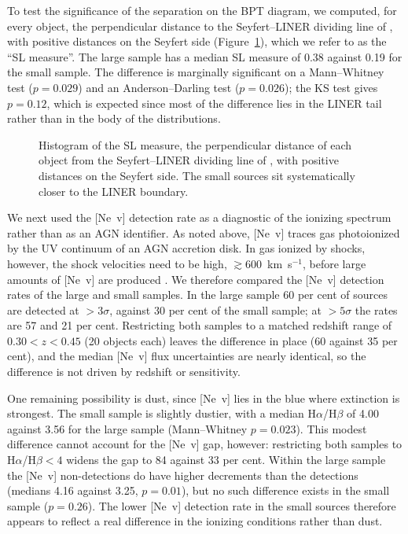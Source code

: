 \documentclass[linenumbers,trackchanges]{aastex701}
\begin{document}
To test the significance of the separation on the BPT diagram, we computed, for every object, the perpendicular distance to the Seyfert--LINER dividing line of \citet{kewley2006}, with positive distances on the Seyfert side (Figure~\ref{fig:bptdist}), which we refer to as the ``SL measure''. The large sample has a median SL measure of 0.38 against 0.19 for the small sample. The difference is marginally significant on a Mann--Whitney test ($p = 0.029$) and an Anderson--Darling test ($p = 0.026$); the KS test gives $p = 0.12$, which is expected since most of the difference lies in the LINER tail rather than in the body of the distributions. 

\begin{figure}
\caption{Histogram of the SL measure, the perpendicular distance of each object from the Seyfert--LINER dividing line of \citet{kewley2006}, with positive distances on the Seyfert side. The small sources sit systematically closer to the LINER boundary.}
\label{fig:bptdist}
\end{figure}

We next used the [Ne~{\sc v}] detection rate as a diagnostic of the ionizing spectrum rather than as an AGN identifier. As noted above, [Ne~{\sc v}] traces gas photoionized by the UV continuum of an AGN accretion disk. In gas ionized by shocks, however, the shock velocities need to be high, $\gtrsim 600$~km~s$^{-1}$, before large amounts of [Ne~{\sc v}] are produced \citep{Allen08}. We therefore compared the [Ne~{\sc v}] detection rates of the large and small samples. In the large sample 60 per cent of sources are detected at $>3\sigma$, against 30 per cent of the small sample; at $>5\sigma$ the rates are 57 and 21 per cent. Restricting both samples to a matched redshift range of $0.30 < z < 0.45$ (20 objects each) leaves the difference in place (60 against 35 per cent), and the median [Ne~{\sc v}] flux uncertainties are nearly identical, so the difference is not driven by redshift or sensitivity.

One remaining possibility is dust, since [Ne~{\sc v}] lies in the blue where extinction is strongest. The small sample is slightly dustier, with a median H$\alpha$/H$\beta$ of 4.00 against 3.56 for the large sample (Mann--Whitney $p = 0.023$). This modest difference cannot account for the [Ne~{\sc v}] gap, however: restricting both samples to H$\alpha$/H$\beta < 4$ widens the gap to 84 against 33 per cent. Within the large sample the [Ne~{\sc v}] non-detections do have higher decrements than the detections (medians 4.16 against 3.25, $p = 0.01$), but no such difference exists in the small sample ($p = 0.26$). The lower [Ne~{\sc v}] detection rate in the small sources therefore appears to reflect a real difference in the ionizing conditions rather than dust.
\end{document}
